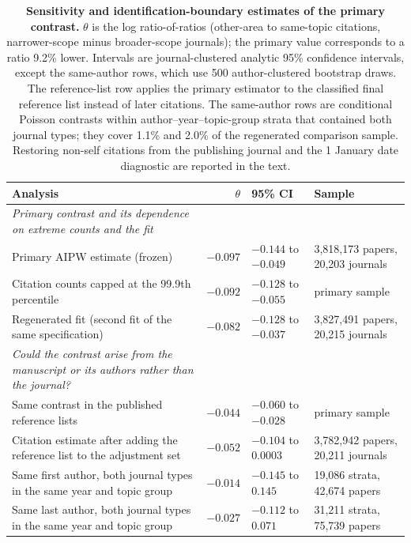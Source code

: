 \begin{table}[H]
\centering
\caption{\textbf{Sensitivity and identification-boundary estimates of the primary contrast.}
$\theta$ is the log ratio-of-ratios (other-area to same-topic citations, narrower-scope minus
broader-scope journals); the primary value corresponds to a ratio 9.2\% lower. Intervals are
journal-clustered analytic 95\% confidence intervals, except the same-author rows, which use 500
author-clustered bootstrap draws. The reference-list row applies the primary estimator to the
classified final reference list instead of later citations. The same-author rows are conditional
Poisson contrasts within author--year--topic-group strata that contained both journal types; they
cover 1.1\% and 2.0\% of the regenerated comparison sample. Restoring non-self citations from the
publishing journal and the 1 January date diagnostic are reported in the text.}
\label{tab:sensitivity}
\footnotesize
\setlength{\tabcolsep}{5pt}
\begin{tabular}{@{}p{7.3cm}rlp{3.6cm}@{}}
\toprule
Analysis & $\theta$ & 95\% CI & Sample \\
\midrule
\addlinespace[3pt]\emph{Primary contrast and its dependence on extreme counts and the fit} & & & \\
\quad Primary AIPW estimate (frozen) & $-0.097$ & $-0.144$ to $-0.049$ & 3,818,173 papers, 20,203 journals \\
\quad Citation counts capped at the 99.9th percentile & $-0.092$ & $-0.128$ to $-0.055$ & primary sample \\
\quad Regenerated fit (second fit of the same specification) & $-0.082$ & $-0.128$ to $-0.037$ & 3,827,491 papers, 20,215 journals \\
\addlinespace[3pt]\emph{Could the contrast arise from the manuscript or its authors rather than the journal?} & & & \\
\quad Same contrast in the published reference lists & $-0.044$ & $-0.060$ to $-0.028$ & primary sample \\
\quad Citation estimate after adding the reference list to the adjustment set & $-0.052$ & $-0.104$ to $0.0003$ & 3,782,942 papers, 20,211 journals \\
\quad Same first author, both journal types in the same year and topic group & $-0.014$ & $-0.145$ to $0.145$ & 19,086 strata, 42,674 papers \\
\quad Same last author, both journal types in the same year and topic group & $-0.027$ & $-0.112$ to $0.071$ & 31,211 strata, 75,739 papers \\
\bottomrule
\end{tabular}
\end{table}
